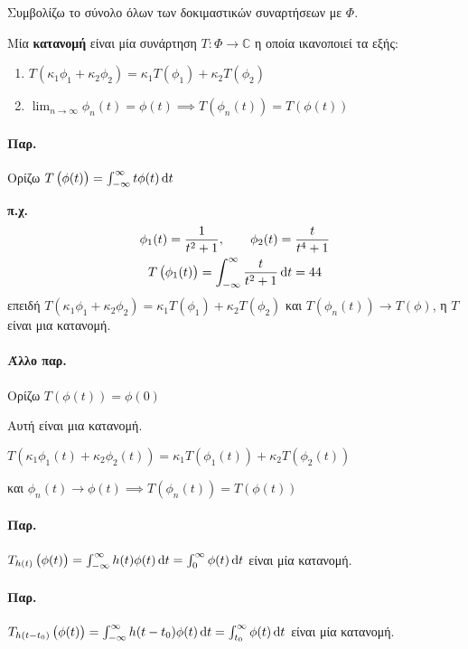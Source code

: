 \documentclass[11pt,a4paper,titlepage,final]{article}
\begin{document}
Συμβολίζω το σύνολο όλων των δοκιμαστικών συναρτήσεων με \( \Phi \).

\begin{defn}{}{}
Μία \textbf{κατανομή} είναι μία συνάρτηση \( T: \Phi \to \mathbb C \) η οποία ικανοποιεί τα εξής:
\begin{enumerate}
\item \( T(\kappa_1\phi_1 + \kappa_2\phi_2) = \kappa_1T(\phi_1) + \kappa_2T(\phi_2) \)
\item \( \lim_{n\to \infty} \phi_n(t) = \phi(t) \implies T\left(\phi_n(t) \right) = T \left( \phi(t) \right) \)
\end{enumerate}
\end{defn}

\paragraph{Παρ.}
Ορίζω \(T\left(\phi(t)\right) = \int_{-\infty}^\infty t\phi(t) \dif t \)

\textbf{π.χ.}
\begin{gather*}
\phi_1(t) = \frac{1}{t^2+1},\qquad \phi_2(t) = \frac{t}{t^4+1} \\
T\left( \phi_1(t) \right) = \int_{-\infty}^\infty \frac{t}{t^2+1} \dif t = 44
\end{gather*}
επειδή \( T(\kappa_1 \phi_1 + \kappa_2\phi_2) = \kappa_1T(\phi_1)+\kappa_2T(\phi_2)  \) και \( T\left(\phi_n(t) \right) \to T(\phi) \), η \( T \) είναι μια κατανομή.

\paragraph{Άλλο παρ.}
Ορίζω \( T\left(\phi(t) \right) = \phi(0) \)

Αυτή είναι μια κατανομή.

\( T\left(\kappa_1 \phi_1(t) + \kappa_2\phi_2(t)\right) = \kappa_1T\left(\phi_1(t)\right) + \kappa_2 T\left(\phi_2(t)\right)\)

και \( \phi_n(t) \to \phi(t) \implies T\left(\phi_n(t) \right) = T\left(\phi(t) \right) \)

\paragraph{Παρ.}
\( T_{h(t)}\left(\phi(t) \right) = \int_{-\infty}^\infty h(t)\phi(t)\dif t = \int_0^\infty \phi(t)\dif t \) είναι μία κατανομή.

\paragraph{Παρ.}
\( T_{h(t-t_0)}\left(\phi(t) \right) = \int_{-\infty}^\infty h(t-t_0)\phi(t)\dif t = \int_{t_0}^\infty \phi(t)\dif t\) είναι μία κατανομή.
\end{document}
